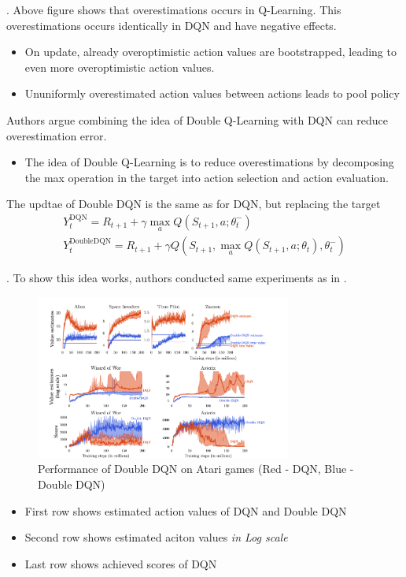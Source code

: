 \documentclass[8pt]{beamer}
\newcommand{\ti}[1]{\textit{#1}}
\begin{document}
\begin{frame}{.}
    Above figure shows that overestimations occurs in Q-Learning.
    This overestimations occurs identically in DQN and have negative effects.
    \begin{itemize}
        \item On update, already overoptimistic action values are bootstrapped, leading to even more overoptimistic action values.
        \item Ununiformly overestimated action values between actions leads to pool policy
    \end{itemize}

    \bigskip
    Authors argue combining the idea of Double Q-Learning with DQN can reduce overestimation error.
    \begin{itemize}
        \item The idea of Double Q-Learning is to reduce overestimations by decomposing the max operation in the target into action selection and action evaluation.
    \end{itemize}

    The updtae of Double DQN is the same as for DQN, but replacing the target
    \[
        \begin{gathered}
            Y^{\text{DQN}}_t = R_{t+1} + \gamma \max_{a} Q(S_{t+1}, a; \theta_t^-) \\
            Y^{\text{DoubleDQN}}_t = R_{t+1} + \gamma Q(S_{t+1}, \max_{a}Q(S_{t+1}, a; \theta_t), \theta_t^{-})
        \end{gathered}
    \]
\end{frame}

\begin{frame}{.}
    To show this idea works, authors conducted same experiments as in \cite{mnih2015human}.

    \begin{figure}
        \includegraphics[width=0.75\textwidth]{Figure3.png}
        \caption{Performance of Double DQN on Atari games (Red - DQN, Blue - Double DQN)}
    \end{figure}

    \begin{itemize}
        \item First row shows estimated action values of DQN and Double DQN
        \item Second row shows estimated aciton values \ti{in Log scale}
        \item Last row shows achieved scores of DQN
    \end{itemize}
\end{frame}
\end{document}
